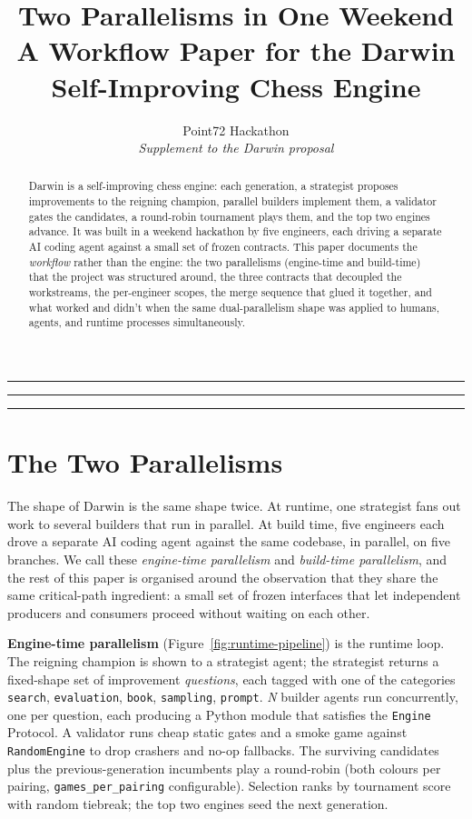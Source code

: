 \documentclass[11pt]{article}
\title{\textbf{Two Parallelisms in One Weekend\\
A Workflow Paper for the Darwin Self-Improving Chess Engine}}
\author{Point72 Hackathon \\ \textit{Supplement to the Darwin proposal}}
\date{}
\begin{document}
\maketitle

\hrule
\vspace{0.6em}

\begin{abstract}
\noindent Darwin is a self-improving chess engine: each generation, a
strategist proposes improvements to the reigning champion, parallel
builders implement them, a validator gates the candidates, a round-robin
tournament plays them, and the top two engines advance. It was built in
a weekend hackathon by five engineers, each driving a separate AI coding
agent against a small set of frozen contracts. This paper documents the
\emph{workflow} rather than the engine: the two parallelisms
(engine-time and build-time) that the project was structured around, the
three contracts that decoupled the workstreams, the per-engineer scopes,
the merge sequence that glued it together, and what worked and didn't
when the same dual-parallelism shape was applied to humans, agents, and
runtime processes simultaneously.
\end{abstract}

\hrule
\vspace{0.4em}

\tableofcontents
\vspace{0.6em}
\hrule

\section{The Two Parallelisms}
\label{sec:two-parallelisms}

The shape of Darwin is the same shape twice. At runtime, one strategist
fans out work to several builders that run in parallel. At build time,
five engineers each drove a separate AI coding agent against the same
codebase, in parallel, on five branches. We call these \emph{engine-time
parallelism} and \emph{build-time parallelism}, and the rest of this
paper is organised around the observation that they share the same
critical-path ingredient: a small set of frozen interfaces that let
independent producers and consumers proceed without waiting on each
other.

\textbf{Engine-time parallelism} (Figure~\ref{fig:runtime-pipeline}) is
the runtime loop. The reigning champion is shown to a strategist agent;
the strategist returns a fixed-shape set of improvement
\emph{questions}, each tagged with one of the categories
\texttt{search}, \texttt{evaluation}, \texttt{book}, \texttt{sampling},
\texttt{prompt}. \emph{N} builder agents run concurrently, one per
question, each producing a Python module that satisfies the
\texttt{Engine} Protocol. A validator runs cheap static gates and a
smoke game against \texttt{RandomEngine} to drop crashers and
no-op fallbacks. The surviving candidates plus the previous-generation
incumbents play a round-robin (both colours per pairing,
\texttt{games\_per\_pairing} configurable). Selection ranks by
tournament score with random tiebreak; the top two engines seed the
next generation.
\end{document}
